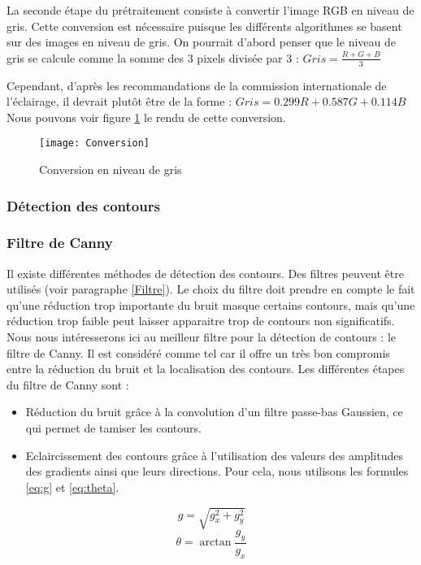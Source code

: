 La seconde étape du prétraitement consiste à convertir l’image RGB en niveau de gris. Cette conversion est nécessaire puisque les différents algorithmes se basent sur des images en niveau de gris. On pourrait d’abord penser que le niveau de gris se calcule comme la somme des 3 pixels divisée par 3 : $Gris = \frac{R + G + B}{3}$

Cependant, d’après les recommandations de la commission internationale de l’éclairage, il devrait plutôt être de la forme : $Gris = 0.299R + 0.587G + 0.114B$
Nous pouvons voir figure \ref{fig:Conversion} le rendu de cette conversion.

\begin{figure}[h]
  \centering
  \texttt{[image: Conversion]}
  \caption{Conversion en niveau de gris}
  \label{fig:Conversion}
\end{figure}

\subsubsection{Détection des contours}

\subsubsection*{Filtre de Canny}

Il existe différentes méthodes de détection des contours. Des filtres peuvent être utilisés (voir paragraphe \ref{Filtre}). Le choix du filtre doit prendre en compte le fait qu’une réduction trop importante du bruit masque certains contours, mais qu’une réduction trop faible peut laisser apparaitre trop de contours non significatifs. Nous nous intéresserons ici au meilleur filtre pour la détection de contours : le filtre de Canny. Il est considéré comme tel car il offre un très bon compromis entre la réduction du bruit et la localisation des contours. Les différentes étapes du filtre de Canny sont :
\begin{itemize}[label=\textbullet,font=\color{black}]
\item Réduction du bruit grâce à la convolution d’un filtre passe-bas Gaussien, ce qui permet de tamiser les contours.
\item Eclaircissement des contours grâce à l’utilisation des valeurs des amplitudes des gradients ainsi que leurs directions. Pour cela, nous utilisons les formules \eqref{eq:g} et \eqref{eq:theta}.
\end{itemize}

\begin{equation}
g = \sqrt{g_x^2 + g_y^2}
\label{eq:g}
\end{equation}
\begin{equation}
\theta = \arctan{\frac{g_y}{g_x}}
\label{eq:theta}
\end{equation}

